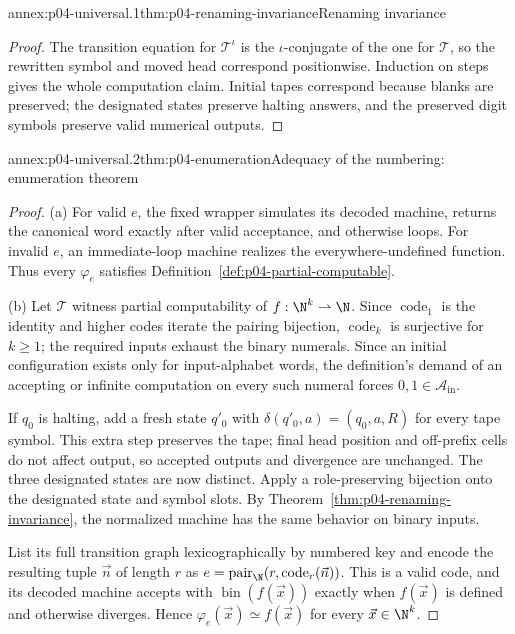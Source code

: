 
\begin{annexitem}{annex:p04-universal.1}{thm:p04-renaming-invariance}{Renaming invariance}
\begin{proof}
The transition equation for \(\mathcal T^\iota\) is the
\(\iota\)-conjugate of the one for \(\mathcal T\), so the rewritten symbol
and moved head correspond positionwise.  Induction on steps gives the whole
computation claim.  Initial tapes correspond because blanks are preserved;
the designated states preserve halting answers, and the preserved digit
symbols preserve valid numerical outputs.
\end{proof}
\end{annexitem}

\begin{annexitem}{annex:p04-universal.2}{thm:p04-enumeration}{Adequacy of the numbering: enumeration theorem}
\begin{proof}
(a) For valid \(e\), the fixed wrapper simulates its decoded machine, returns
the canonical word exactly after valid acceptance, and otherwise loops.  For
invalid \(e\), an immediate-loop machine realizes the everywhere-undefined
function.  Thus every \(\varphi_e\) satisfies
Definition~\ref{def:p04-partial-computable}.

(b) Let \(\mathcal T\) witness partial computability of
\(f:\N^k\rightharpoonup\N\).  Since \(\operatorname{code}_1\) is the identity
and higher codes iterate the pairing bijection, \(\operatorname{code}_k\) is
surjective for \(k\ge1\); the required inputs exhaust the binary numerals.
Since an initial configuration exists only for input-alphabet words, the
definition's demand of an accepting or infinite computation on every such
numeral forces \(0,1\in\mathcal A_{\mathrm{in}}\).

If \(q_0\) is halting, add a fresh state \(q'_0\) with
\(\delta(q'_0,a)=(q_0,a,R)\) for every tape symbol.  This extra step preserves
the tape; final head position and off-prefix cells do not affect output, so
accepted outputs and divergence are unchanged.  The three designated states
are now distinct.  Apply a role-preserving bijection onto the designated state
and symbol slots.  By Theorem~\ref{thm:p04-renaming-invariance}, the normalized
machine has the same behavior on binary inputs.

List its full transition graph lexicographically by numbered key and encode
the resulting tuple \(\vec n\) of length \(r\) as
\(e=\operatorname{pair}_{\N}(r,\operatorname{code}_r(\vec n))\).  This is a
valid code, and its decoded machine accepts with
\(\operatorname{bin}(f(\vec x))\) exactly when \(f(\vec x)\) is defined and
otherwise diverges.  Hence
\(\varphi_e(\vec x)\simeq f(\vec x)\) for every \(\vec x\in\N^k\).
\end{proof}
\end{annexitem}

